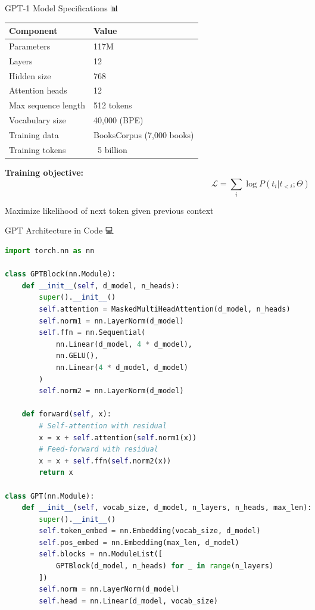 \documentclass[aspectratio=169]{beamer}
\begin{document}
\begin{frame}{GPT-1 Model Specifications 📊}
    \begin{table}
        \begin{tabular}{ll}
            \toprule
            \textbf{Component} & \textbf{Value} \\
            \midrule
            Parameters & 117M \\
            Layers & 12 \\
            Hidden size & 768 \\
            Attention heads & 12 \\
            Max sequence length & 512 tokens \\
            Vocabulary size & 40,000 (BPE) \\
            Training data & BooksCorpus (7,000 books) \\
            Training tokens & ~5 billion \\
            \bottomrule
        \end{tabular}
    \end{table}

    \vspace{0.3cm}

    \textbf{Training objective:}
    $$\mathcal{L} = \sum_{i} \log P(t_i | t_{<i}; \Theta)$$

    Maximize likelihood of next token given previous context
\end{frame}

\begin{frame}[fragile]{GPT Architecture in Code 💻}
\begin{lstlisting}[language=Python]
import torch.nn as nn

class GPTBlock(nn.Module):
    def __init__(self, d_model, n_heads):
        super().__init__()
        self.attention = MaskedMultiHeadAttention(d_model, n_heads)
        self.norm1 = nn.LayerNorm(d_model)
        self.ffn = nn.Sequential(
            nn.Linear(d_model, 4 * d_model),
            nn.GELU(),
            nn.Linear(4 * d_model, d_model)
        )
        self.norm2 = nn.LayerNorm(d_model)

    def forward(self, x):
        # Self-attention with residual
        x = x + self.attention(self.norm1(x))
        # Feed-forward with residual
        x = x + self.ffn(self.norm2(x))
        return x

class GPT(nn.Module):
    def __init__(self, vocab_size, d_model, n_layers, n_heads, max_len):
        super().__init__()
        self.token_embed = nn.Embedding(vocab_size, d_model)
        self.pos_embed = nn.Embedding(max_len, d_model)
        self.blocks = nn.ModuleList([
            GPTBlock(d_model, n_heads) for _ in range(n_layers)
        ])
        self.norm = nn.LayerNorm(d_model)
        self.head = nn.Linear(d_model, vocab_size)
\end{lstlisting}
\end{frame}
\end{document}

